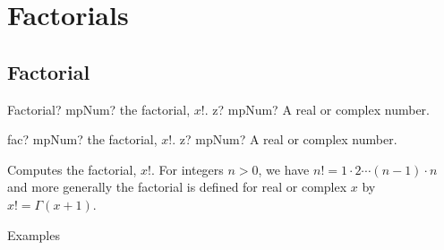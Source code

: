 %
%
%
%
%
%
%
%
%

\section{Factorials}

\subsection{Factorial}

\begin{mpFunctionsExtract}
	\mpFunctionOne
	{Factorial? mpNum? the factorial, $x!$.}
	{z? mpNum? A real or complex number.}
\end{mpFunctionsExtract}


\begin{mpFunctionsExtract}
	\mpFunctionOne
	{fac? mpNum? the factorial, $x!$.}
	{z? mpNum? A real or complex number.}
\end{mpFunctionsExtract}



Computes the factorial, $x!$. For integers $n>0$, we have $n!=1\cdot 2 \cdots (n-1) \cdot n$ and more generally the factorial is defined for real or complex $x$ by $x!=\Gamma(x+1)$.

Examples

